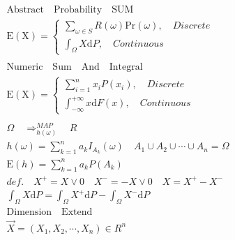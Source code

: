 \documentclass{article}
\begin{document}
\clearpage

\begin{align*}
    \mathrm{Abstract \quad Probability \quad SUM}\\
    \mathrm{E(X)} =
    \left\{
        \begin{array}{rl}
            \sum_{\omega \in S} R(\omega) \mathrm{Pr}(\omega) ,\quad Discrete\\ 
            \int_{\Omega} X \mathrm{d}P ,\quad Continuous
        \end{array}
    \right.\\ \quad \\ 
    \mathrm{Numeric \quad Sum \quad And \quad Integral}\\
    \mathrm{E(X)} =
    \left\{
        \begin{array}{rl}
            \sum_{i=1}^{n}x_{i}P(x_{i}),\quad Discrete\\ 
            \int_{-\infty}^{+\infty} x \mathrm{d}F(x) ,\quad Continuous
        \end{array}
    \right.\\
    \\
    \Omega \quad \Longrightarrow_{h(\omega)}^{MAP} \quad R \\
    h(\omega) = \sum_{k=1}^{n}a_{k}I_{A_{k}}(\omega) \quad A_{1} \cup A_{2} \cup \cdots \cup  A_{n} = \Omega \\
    \mathrm{E}(h) = \sum_{k=1}^{n} a_{k}P(A_{k}) \\
    def. \quad X^{+} = X \vee 0 \quad X^{-} = -X \vee 0 \quad X = X^{+} - X^{-} \\
    \int_{\Omega}X\mathrm{d}P = \int_{\Omega}X^{+}\mathrm{d}P - \int_{\Omega}X^{-}\mathrm{d}P \\
    \mathrm{Dimension \quad Extend} \\ 
    \vec{X} = (X_{1},X_{2}, \cdots , X_{n}) \in R^{n}\\
\end{align*}
\end{document}
